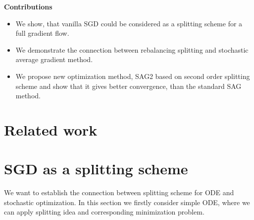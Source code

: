 \documentclass{article} %
\begin{document}
\textbf{Contributions}
\begin{itemize}
    \item We show, that vanilla SGD could be considered as a splitting scheme for a full gradient flow.
    \item We demonstrate the connection between rebalancing splitting and stochastic average gradient method.
    \item We propose new optimization method, SAG2 based on second order splitting scheme and show that it gives better convergence, than the standard SAG method.
\end{itemize}
\section{Related work}




\section{SGD as a splitting scheme}

We want to establish the connection between splitting scheme for ODE and stochastic optimization. In this section we firstly consider simple ODE, where we can apply splitting idea and corresponding minimization problem.
\end{document}

